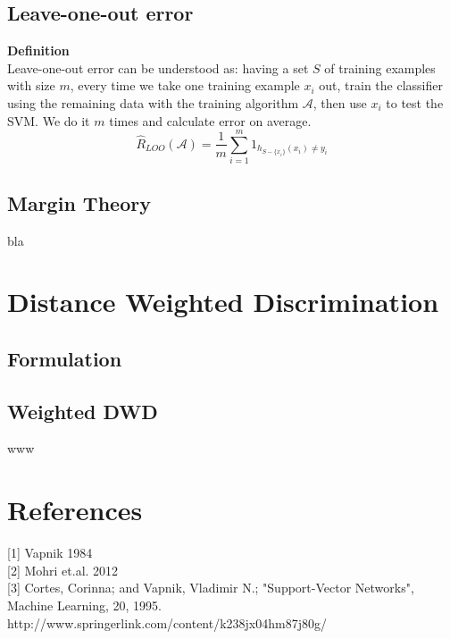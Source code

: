 \documentclass[12pt]{article}
\theoremstyle{definition}
\theoremstyle{remark}
\numberwithin{equation}{section}
\begin{document}
\subsection{Leave-one-out error}
\textbf{Definition} \\[0.2cm]
Leave-one-out error can be understood as: having a set $S$ of training examples with size $m$, every time we take one training example $x_i$ out, train the classifier using the remaining data with the training algorithm $\mathcal{A}$, then use $x_i$ to test the SVM. We do it $m$ times and calculate error on average. 
\[\widehat{R}_{LOO}(\mathcal{A})=\frac{1}{m}\sum_{i=1}^{m}1_{h_{S-\{x_i\}}(x_i)\neq y_i}\] 
\subsection{Margin Theory}
bla
\section{Distance Weighted Discrimination}
\subsection{Formulation}
\subsection{Weighted DWD}
www

\section{References}
[1] Vapnik 1984 \\[0.2cm]
[2] Mohri et.al. 2012 \\ [0.2cm]
[3] Cortes, Corinna; and Vapnik, Vladimir N.; "Support-Vector Networks", Machine Learning, 20, 1995.\\ http://www.springerlink.com/content/k238jx04hm87j80g/
\end{document}
